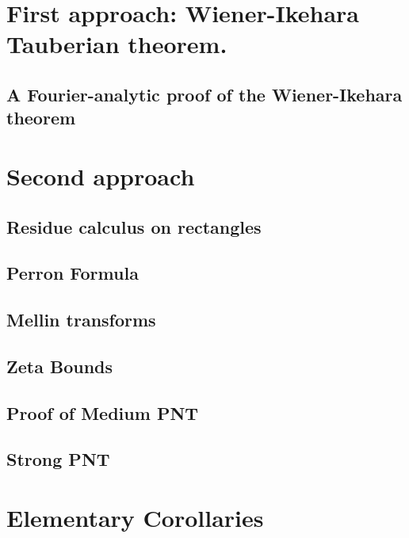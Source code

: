 \chapter{First approach: Wiener-Ikehara Tauberian theorem.}

\section{A Fourier-analytic proof of the Wiener-Ikehara theorem}



\chapter{Second approach}

\section{Residue calculus on rectangles}



\section{Perron Formula}


\section{Mellin transforms}



\section{Zeta Bounds}


\section{Proof of Medium PNT}




%

%

\section{Strong PNT}



\chapter{Elementary Corollaries}




